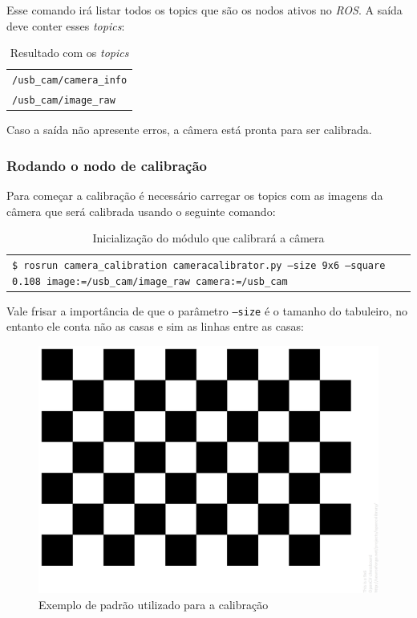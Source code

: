 Esse comando irá listar todos os topics que são os nodos ativos no \textit{ROS}. A saída deve conter esses \textit{topics}:

\begin{table}[!ht]
\begin{tabular}{| p{\textwidth}|}
\hline
\texttt{/usb\_cam/camera\_info} \\
\texttt{/usb\_cam/image\_raw}\\
\hline
\end{tabular}
\caption{Resultado com os \textit{topics}}
\end{table}

Caso a saída não apresente erros, a câmera está pronta para ser calibrada.

\subsubsection{Rodando o nodo de calibração}

Para começar a calibração é necessário carregar os topics com as imagens da câmera que será calibrada usando o seguinte comando:

\begin{table}[!ht]
\begin{tabular}{| p{\textwidth}|}
\hline
\texttt{\$ rosrun camera\_calibration cameracalibrator.py --size 9x6 --square 0.108 image:=/usb\_cam/image\_raw camera:=/usb\_cam}
\hline
\end{tabular}
\caption{ Inicialização do módulo que calibrará a câmera}
\end{table}

Vale frisar a importância de que o parâmetro \texttt{--size} é o tamanho do tabuleiro, no entanto ele conta não as casas e sim as linhas entre as casas:

\begin{figure}[!htb]
	\centering
		\includegraphics[width= \textwidth]{Imagens/figura3-3E3-12.png}
	\caption{Exemplo de padrão utilizado para a calibração}
	\label{fig3:12}
\end{figure}


